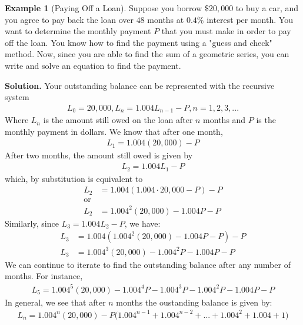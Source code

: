 \documentclass[10pt,]{book}
\theoremstyle{plain}
\theoremstyle{definition}
\theoremstyle{definition}
\newtheorem{example}[theorem]{Example}
\theoremstyle{definition}
\numberwithin{equation}{section}
\begin{document}
\begin{example}[Paying Off a Loan]\label{example-12}
\hypertarget{p-155}{}%
Suppose you borrow \(\$20,000\) to buy a car, and you agree to pay back the loan over \(48\) months at \(0.4 \%\) interest per month.  You want to determine the monthly payment \(P\) that you must make in order to pay off the loan. You know how to find the payment using a "guess and check" method.  Now, since you are able to find the sum of a geometric series, you can write and solve an equation to find the payment.%
\par\smallskip%
\noindent\textbf{Solution.}\hypertarget{solution-12}{}\quad%
\hypertarget{p-156}{}%
Your outstanding balance can be represented with the recursive system%
%
\begin{gather*}
L_0=20,000, L_n=1.004L_{n-1}-P, n=1,2,3,...
\end{gather*}
\hypertarget{p-157}{}%
Where \(L_n\) is the amount still owed on the loan after \(n\) months and \(P\) is the monthly payment in dollars.  We know that after one month,%
%
\begin{gather*}
L_1=1.004(20,000)-P
\end{gather*}
\hypertarget{p-158}{}%
After two months, the amount still owed is given by%
%
\begin{gather*}
L_2 = 1.004L_1-P
\end{gather*}
\hypertarget{p-159}{}%
which, by substitution is equivalent to%
%
\begin{align*}
L_2&=1.004(1.004 \cdot 20,000 - P) - P\\
\text{or}\\
L_2&=1.004^2(20,000)-1.004P-P
\end{align*}
\hypertarget{p-160}{}%
Similarly, since \(L_3=1.004L_2-P\), we have:%
%
\begin{align*}
L_3&=1.004(1.004^2 (20,000) - 1.004P - P) - P\\
L_3&=1.004^3(20,000) - 1.004^2P - 1.004P - P
\end{align*}
\hypertarget{p-161}{}%
We can continue to iterate to find the outstanding balance after any number of months. For instance,%
%
\begin{gather*}
L_5=1.004^5 (20,000)-1.004^4 P-1.004^3 P-1.004^2 P-1.004P-P
\end{gather*}
\hypertarget{p-162}{}%
In general, we see that after \(n\) months the oustanding balance is given by:%
%
\begin{gather}
L_n=1.004^n (20,000) - P \big( 1.004^{n-1} + 1.004^{n-2} + ... + 1.004^2 + 1.004 + 1 \big)\label{general-annuity-formula-long}

\end{gather}
\end{example}
\end{document}
